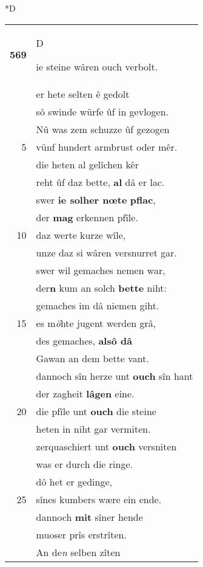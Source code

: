 \documentclass[8pt,a4paper,notitlepage]{article}
\begin{document}
\begin{table}[ht]
\begin{minipage}[t]{0.5\linewidth}
\small
\begin{center}*D
\end{center}
\begin{tabular}{rl}
\textbf{569} & \begin{large}D\end{large}ie steine wâren ouch verbolt.\\ 
 & er hete selten ê gedolt\\ 
 & sô swinde würfe ûf in gevlogen.\\ 
 & Nû was zem schuzze ûf gezogen\\ 
5 & vünf hundert armbrust oder mêr.\\ 
 & die heten al gelîchen kêr\\ 
 & reht ûf daz bette, \textbf{al} dâ er lac.\\ 
 & swer \textbf{ie solher nœte} \textbf{pflac},\\ 
 & der \textbf{mag} erkennen pfîle.\\ 
10 & daz werte kurze wîle,\\ 
 & unze daz si wâren versnurret gar.\\ 
 & swer wil gemaches nemen war,\\ 
 & der\textbf{n} kum an solch \textbf{bette} niht:\\ 
 & gemaches im dâ niemen giht.\\ 
15 & es m\textit{ö}hte jugent werden grâ,\\ 
 & des gemaches, \textbf{alsô dâ}\\ 
 & Gawan an dem bette vant.\\ 
 & dannoch sîn herze unt \textbf{ouch} sîn hant\\ 
 & der zagheit \textbf{lâgen} eine.\\ 
20 & die pfîle unt \textbf{ouch} die steine\\ 
 & heten in niht gar vermiten.\\ 
 & zerquaschiert unt \textbf{ouch} versniten\\ 
 & was er durch die ringe.\\ 
 & dô het er gedinge,\\ 
25 & sînes kumbers wære ein ende.\\ 
 & dannoch \textbf{mit} sîner hende\\ 
 & muoser prîs erstrîten.\\ 
 & An de\textit{n} selben zîten\\ 

\end{tabular}
\end{minipage}
\end{table}
\end{document}
